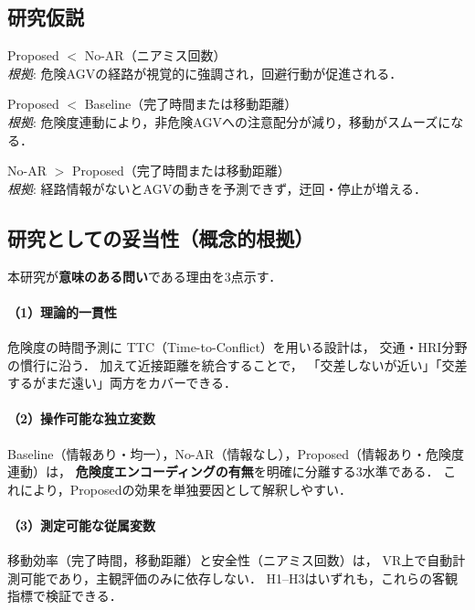 \subsection{研究仮説}

\begin{description}[leftmargin=0em,style=nextline]
  \item[\textbf{H1（安全性）}]
    Proposed $<$ No-AR（ニアミス回数）\\
    \emph{根拠}: 危険AGVの経路が視覚的に強調され，回避行動が促進される．

  \item[\textbf{H2（効率）}]
    Proposed $<$ Baseline（完了時間または移動距離）\\
    \emph{根拠}: 危険度連動により，非危険AGVへの注意配分が減り，移動がスムーズになる．

  \item[\textbf{H3（情報の有用性）}]
    No-AR $>$ Proposed（完了時間または移動距離）\\
    \emph{根拠}: 経路情報がないとAGVの動きを予測できず，迂回・停止が増える．
\end{description}

\subsection{研究としての妥当性（概念的根拠）}

本研究が\textbf{意味のある問い}である理由を3点示す．

\paragraph{（1）理論的一貫性}
危険度の時間予測に TTC（Time-to-Conflict）を用いる設計は，
交通・HRI分野の慣行に沿う．
加えて近接距離を統合することで，
「交差しないが近い」「交差するがまだ遠い」両方をカバーできる．

\paragraph{（2）操作可能な独立変数}
Baseline（情報あり・均一），No-AR（情報なし），Proposed（情報あり・危険度連動）は，
\textbf{危険度エンコーディングの有無}を明確に分離する3水準である．
これにより，Proposedの効果を単独要因として解釈しやすい．

\paragraph{（3）測定可能な従属変数}
移動効率（完了時間，移動距離）と安全性（ニアミス回数）は，
VR上で自動計測可能であり，主観評価のみに依存しない．
H1--H3はいずれも，これらの客観指標で検証できる．
